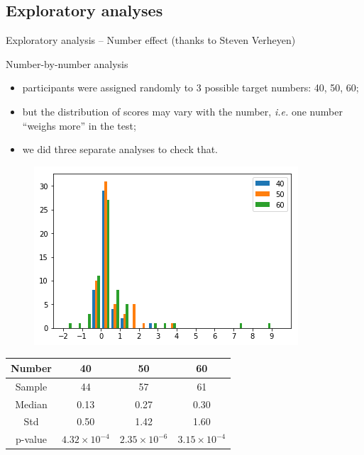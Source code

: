 \documentclass[xcolor=table, hyperref={pdfpagelabels=false}]{beamer}
\begin{document}
\subsection{Exploratory analyses}
\begin{frame}{Exploratory analysis -- Number effect (thanks to Steven Verheyen)}
	\begin{block}{Number-by-number analysis}
		\begin{itemize}
			\item participants were assigned randomly to 3 possible target numbers: 40, 50, 60;
			\item but the distribution of scores may vary with the number, \textit{i.e.} one number ``weighs more'' in the test;
			\item we did three separate analyses to check that.
		\end{itemize}
	\end{block}
\begin{minipage}{.52\textwidth}
	\begin{figure}
	\includegraphics[width=\textwidth]{./images/dist_scores_by_number.png}
\end{figure}
\end{minipage}
\begin{minipage}{.43\textwidth}
	\setlength\tabcolsep{3pt}  %
	\tiny
	\begin{table}
	\begin{tabular}{c|ccc}
		Number & 40 & 50 & 60 \\ \hline
		Sample & 44 & 57 & 61 \\
		Median & 0.13 & 0.27 & 0.30 \\
		Std & 0.50 & 1.42 & 1.60 \\
		p-value & $4.32 \times 10^{-4}$ & $2.35 \times 10^{-6}$ & $3.15 \times 10^{-4}$
	\end{tabular}
\end{table}
\end{minipage}
\end{frame}
\end{document}
